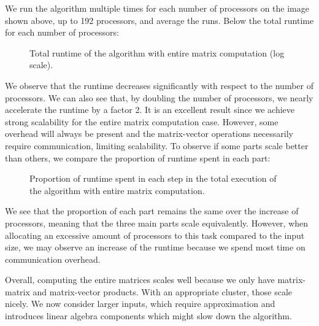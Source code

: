 We run the algorithm multiple times for each number of processors on the image shown above, up to 192 processors, and average the runs.
Below the total runtime for each number of processors:
\begin{figure}[H]
  \centering
  
  \caption{Total runtime of the algorithm with entire matrix computation (log scale).}
\end{figure}

We observe that the runtime decreases significantly with respect to the number of processors.
We can also see that, by doubling the number of processors, we nearly accelerate the runtime by a factor 2.
It is an excellent result since we achieve strong scalability for the entire matrix computation case.
However, some overhead will always be present and the matrix-vector operations necessarily require communication, limiting scalability.
To observe if some parts scale better than others, we compare the proportion of runtime spent in each part:
\begin{figure}[H]
  \centering
  
  \caption{Proportion of runtime spent in each step in the total execution of the algorithm with entire matrix computation.}
\end{figure}

We see that the proportion of each part remains the same over the increase of processors, meaning that the three main parts scale equivalently.
However, when allocating an excessive amount of processors to this task compared to the input size, we may observe an increase of the runtime because we spend most time on communication overhead.

Overall, computing the entire matrices scales well because we only have matrix-matrix and matrix-vector products.
With an appropriate cluster, those scale nicely.
We now consider larger inputs, which require approximation and introduces linear algebra components which might slow down the algorithm.

